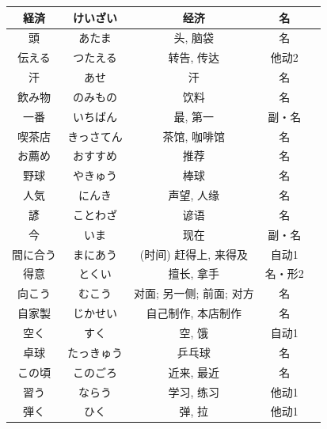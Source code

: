 \begin{longtable}{|c|c|c|c|c|}
経済 & けいざい & 经济 & 名 &  \\ \hline
頭 & あたま & 头, 脑袋 & 名 &  \\ \hline
伝える & つたえる & 转告, 传达 & 他动2 &  \\ \hline
汗 & あせ & 汗 & 名 &  \\ \hline
飲み物 & のみもの & 饮料 & 名 &  \\ \hline
一番 & いちばん & 最, 第一 & 副・名 &  \\ \hline
喫茶店 & きっさてん & 茶馆, 咖啡馆 & 名 &  \\ \hline
お薦め & おすすめ & 推荐 & 名 &  \\ \hline
野球 & やきゅう & 棒球 & 名 &  \\ \hline
人気 & にんき & 声望, 人缘 & 名 &  \\ \hline
諺 & ことわざ & 谚语 & 名 &  \\ \hline
今 & いま & 现在 & 副・名 &  \\ \hline
間に合う & まにあう & (时间) 赶得上, 来得及 & 自动1 &  \\ \hline
得意 & とくい & 擅长, 拿手 & 名・形2 &  \\ \hline
向こう & むこう & 对面; 另一侧; 前面; 对方 & 名 &  \\ \hline
自家製 & じかせい & 自己制作, 本店制作 & 名 &  \\ \hline
空く & すく & 空, 饿 & 自动1 &  \\ \hline
卓球 & たっきゅう & 乒乓球 & 名 &  \\ \hline
この頃 & このごろ & 近来, 最近 & 名 &  \\ \hline
習う & ならう & 学习, 练习 & 他动1 &  \\ \hline
弾く & ひく & 弹, 拉 & 他动1 &  \\ \hline
\end{longtable}

